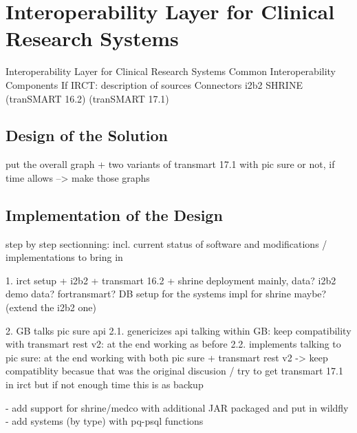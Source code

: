 
\chapter{Interoperability Layer for Clinical Research Systems}

Interoperability Layer for Clinical Research Systems
Common Interoperability Components
If IRCT: description of sources
Connectors
i2b2
SHRINE
(tranSMART 16.2)
(tranSMART 17.1)

\section{Design of the Solution}

put the overall graph + two variants of transmart 17.1 with pic sure or not, if time allows
--> make those graphs


\section{Implementation of the Design}

step by step sectionning: incl. current status of software and modifications / implementations to bring in

1. irct setup + i2b2 + transmart 16.2 + shrine
deployment mainly, data? i2b2 demo data? fortransmart? 
DB setup for the systems
impl for shrine maybe? (extend the i2b2 one)

2. GB talks pic sure api
2.1. genericizes api talking within GB: keep compatibility with transmart rest v2: at the end working as before
2.2. implements talking to pic sure: at the end working with both pic sure + transmart rest v2 
-> keep compatiblity becasue that was the original discusion / try to get transmart 17.1 in irct but if not enough time this is as backup


- add support for shrine/medco with additional JAR packaged and put in wildfly
- add systems (by type) with pq-psql functions



